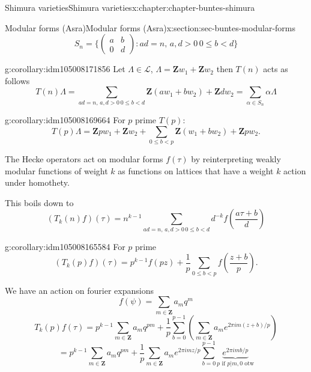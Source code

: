 \documentclass[oneside,10pt,]{book}
\numberwithin{equation}{section}
\newcommand{\ZZ}{\mathbf{Z}}
\newcommand{\lt}{<}
\newcommand{\gt}{>}
\newcommand{\amp}{&}
\begin{document}
\begin{chapterptx}{Shimura varieties}{}{Shimura varieties}{}{}{x:chapter:chapter-buntes-shimura}
\begin{sectionptx}{Modular forms (Asra)}{}{Modular forms (Asra)}{}{}{x:section:sec-buntes-modular-forms}
\begin{equation*}
S_n = \{\begin{pmatrix} a\amp b \\ 0 \amp d\end{pmatrix} : ad= n,\, a,d\gt 0\, 0\le b \lt d\}
\end{equation*}
%
\begin{corollary}{}{}{g:corollary:idm105008171856}%
Let \(\Lambda \in \mathcal L\), \(\Lambda = \ZZ w_1 + \ZZ w_2\) then  \(T(n)\) acts as follows%
\begin{equation*}
T(n) \Lambda =  \sum_{ ad= n,\, a,d\gt 0\, 0\le b \lt d} \ZZ(aw_1 + bw_2) + \ZZ dw_2 = \sum_{\alpha \in S_n} \alpha \Lambda
\end{equation*}
%
\end{corollary}
\begin{corollary}{}{}{g:corollary:idm105008169664}%
For \(p \) prime \(T(p)\):%
\begin{equation*}
T(p) \Lambda = \ZZ pw_1 + \ZZ w_2 +\sum_{0 \le b \lt p} \ZZ(w_1 + bw_2) + \ZZ pw_2\text{.}
\end{equation*}
%
\end{corollary}
The Hecke operators act on modular forms \(f(\tau)\) by reinterpreting weakly modular functions of weight \(k\) as functions on lattices that have  a weight \(k\) action under homothety.%
\par
This boils down to%
\begin{equation*}
(T_k(n) f)(\tau) = n^{k-1}  \sum_{ ad= n,\, a,d\gt 0\, 0\le b \lt d} d^{-k} f\left( \frac{ a\tau +b}{d}\right)
\end{equation*}
%
\begin{corollary}{}{}{g:corollary:idm105008165584}%
For \(p \) prime%
\begin{equation*}
(T_k(p) f)(\tau) = p^{k-1}f(pz) +\frac 1p \sum_{0 \le b  \lt p} f\left( \frac {z + b}{p} \right)\text{.}
\end{equation*}
%
\end{corollary}
We have an action on fourier expansions%
\begin{equation*}
f(\psi) = \sum_{m\in \ZZ} a_m q^m
\end{equation*}
%
\begin{equation*}
T_k(p)f(\tau) = p^{k-1} \sum_{m\in \ZZ} a_m q^{pm} + \frac{1}{p} \sum_{b=0}^{p-1}  \left( \sum_{m\in \ZZ} a_m e^{2\pi i m (z+b)/p}\right)
\end{equation*}
%
\begin{equation*}
= p^{k-1} \sum_{m\in \ZZ} a_m q^{pm} + \frac{1}{p}  \sum_{m\in \ZZ} a_me^{2\pi i m z/p} \sum_{b=0}^{p-1} \underbrace{e^{2\pi i m b/p}}_{p\text{ if }p|m,0\text{ otw}}

\end{equation*}
\end{sectionptx}
\end{chapterptx}
\end{document}
